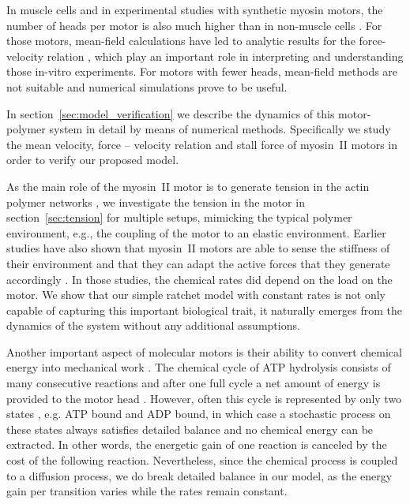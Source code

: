 \documentclass[aps,pre,twocolumn,showpacs,showkeys,superscriptaddress,floatfix]{revtex4-1}
\begin{document}
In muscle cells and in experimental studies with synthetic myosin motors, 
the number of heads per motor is also much higher than in non-muscle cells \cite{brown2009cross-correlated}.
For those motors, mean-field calculations have led to analytic results for the force-velocity relation \cite{julicher1997modeling},
which play an important role in interpreting and understanding those in-vitro experiments.
For motors with fewer heads, mean-field methods are not suitable and numerical simulations prove to be useful.

In section~\ref{sec:model_verification} we describe the dynamics of this motor-polymer system in detail by means of numerical methods.
Specifically we study the mean velocity, force -- velocity relation and stall force of myosin~II motors in order to verify our proposed model. 

As the main role of the myosin~II motor is to generate tension in the actin polymer networks \cite{ma2012nonmuscle,chugh2017actin,monier2010actomyosin}, 
we investigate the tension in the motor in section~\ref{sec:tension} for multiple setups, 
mimicking the typical polymer environment, 
e.g., the coupling of the motor to an elastic environment.
Earlier studies have also shown that myosin~II motors are able to sense the stiffness of their environment and that they can adapt the active forces that they generate accordingly \cite{stam2015isoforms,Albert2014}.
In those studies, the chemical rates did depend on the load on the motor. 
We  show that our simple ratchet model with constant rates is not only capable of capturing this important biological trait, it naturally emerges from the dynamics of the system without any additional assumptions.

Another important aspect of molecular motors is their ability to convert chemical energy into mechanical work \cite{astumian1996mechanochemical}.
The chemical cycle of ATP hydrolysis consists of many consecutive reactions and after one full cycle a net amount of energy is provided to the motor head \cite{gajewski1986thermodynamics}.
However, often this cycle is represented by only two states \cite{julicher1997modeling,Reimann2002introduction}, e.g. ATP bound and ADP bound, 
in which case a stochastic process on these states always satisfies detailed balance and no chemical energy can be extracted. 
In other words, the energetic gain of one reaction is canceled by the cost of the following reaction.
Nevertheless, since the chemical process is coupled to a diffusion process, we do break detailed balance in our model, 
as the energy gain per transition varies while the rates remain constant.
\end{document}
